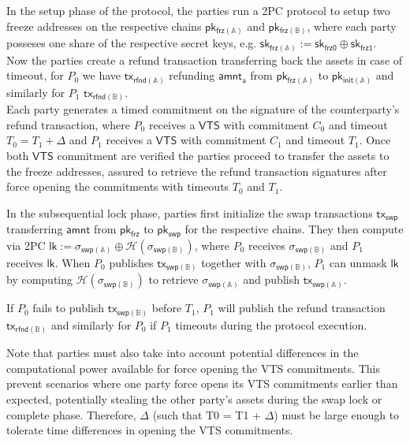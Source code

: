 In the setup phase of the protocol, the parties run a 2PC protocol to setup two freeze addresses on the respective chains $\mathsf{pk_{frz(\mathbb{A})}}$ and $\mathsf{pk_{frz(\mathbb{B})}}$, where each party posseses one share of the respective secret keys, e.g. $\mathsf{sk_{frz(\mathbb{A})}} := \mathsf{sk_{frz0}} \oplus  \mathsf{sk_{frz1}}$. \\
Now the parties create a refund transaction transferring back the assets in case of timeout, for $P_0$ we have $\mathsf{tx_{rfnd(\mathbb{A})}}$ refunding $\mathsf{amnt_a}$ from $\mathsf{pk_{frz(\mathbb{A})}}$ to $\mathsf{pk_{init(\mathbb{A})}}$ and similarly for $P_1$ $\mathsf{tx_{rfnd(\mathbb{B})}}$. \\
Each party generates a timed commitment on the signature of the counterparty's refund transaction, where $P_0$ receives a $\mathsf{VTS}$ with commitment $C_0$ and timeout $T_0 = T_1 + \Delta$ and $P_1$ receives a $\mathsf{VTS}$ with commitment $C_1$ and timeout $T_1$. Once both $\mathsf{VTS}$ commitment are verified the parties proceed to transfer the assets to the freeze addresses, assured to retrieve the refund transaction signatures after force opening the commitments with timeouts $T_0$ and $T_1$.

In the subsequential lock phase, parties first initialize the swap transactions $\mathsf{tx_{swp}}$ transferring $\mathsf{amnt}$ from $\mathsf{pk_{frz}}$ to $\mathsf{pk_{swp}}$ for the respective chains. They then compute via 2PC $\mathsf{lk} := \sigma_{\mathsf{swp}(\mathbb{A})} \oplus \mathcal{H}(\sigma_{\mathsf{swp}(\mathbb{B})})$, where  $P_0$ receives $\sigma_{\mathsf{swp}(\mathbb{B})}$ and $P_1$ receives $\mathsf{lk}$.  When $P_0$ publishes $\mathsf{tx_{swp(\mathbb{B})}}$ together with  $\sigma_{\mathsf{swp}(\mathbb{B})}$, $P_1$ can unmask $\mathsf{lk}$ by computing $\mathcal{H}(\sigma_{\mathsf{swp}(\mathbb{B})})$ to retrieve $\sigma_{\mathsf{swp}(\mathbb{A})}$ and publish $\mathsf{tx_{swp(\mathbb{A})}}$.

 If $P_0$ fails to publish $\mathsf{tx_{swp(\mathbb{B})}}$ before $T_1$, $P_1$ will publish the refund transaction $\mathsf{tx_{rfnd(\mathbb{B})}}$ and similarly for $P_0$ if $P_1$ timeouts during the protocol execution.

Note that parties must also take into account potential differences in the computational power available for force opening the VTS commitments. This prevent scenarios where one party force opens its VTS commitments earlier than expected, potentially stealing 
 the other party's assets during the swap lock or complete phase. Therefore,  $\Delta$ (such that T0 = T1 + $\Delta$) must be large enough to tolerate time differences in opening the VTS commitments. \\
